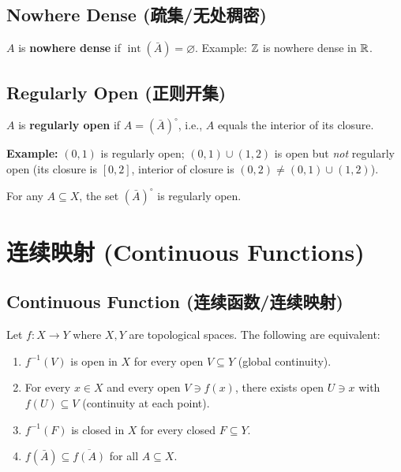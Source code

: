\documentclass{article}
\begin{document}
\subsection{Nowhere Dense (疏集/无处稠密)}\label{def:nowhere-dense}
$A$ is \textbf{nowhere dense} if $\operatorname{int}(\bar{A}) = \varnothing$.
Example: $\mathbb{Z}$ is nowhere dense in $\mathbb{R}$.

\subsection{Regularly Open (正则开集)}\label{def:regularly-open}
\begin{definition}
  $A$ is \textbf{regularly open} if $A = (\bar{A})^\circ$, i.e., $A$
  equals the interior of its closure.
\end{definition}
\textbf{Example:} $(0, 1)$ is regularly open; $(0, 1) \cup (1, 2)$ is
open but \emph{not} regularly open (its closure is $[0, 2]$, interior
of closure is $(0, 2) \ne (0, 1) \cup (1, 2)$).

\begin{proposition}
  For any $A \subseteq X$, the set $(\bar{A})^\circ$ is regularly open.
\end{proposition}

\section{连续映射 (Continuous Functions)}

\subsection{Continuous Function (连续函数/连续映射)}\label{def:continuous}
\begin{theorem}
  Let $f : X \to Y$ where $X, Y$ are topological spaces. The
  following are equivalent:
  \begin{enumerate}
    \item $f^{-1}(V)$ is open in $X$ for every open $V \subseteq Y$
      (global continuity).
    \item For every $x \in X$ and every open $V \ni f(x)$, there
      exists open $U \ni x$ with $f(U) \subseteq V$ (continuity at each point).
    \item $f^{-1}(F)$ is closed in $X$ for every closed $F \subseteq Y$.
    \item $f(\bar{A}) \subseteq \overline{f(A)}$ for all $A \subseteq X$.
  \end{enumerate}
\end{theorem}
\end{document}
